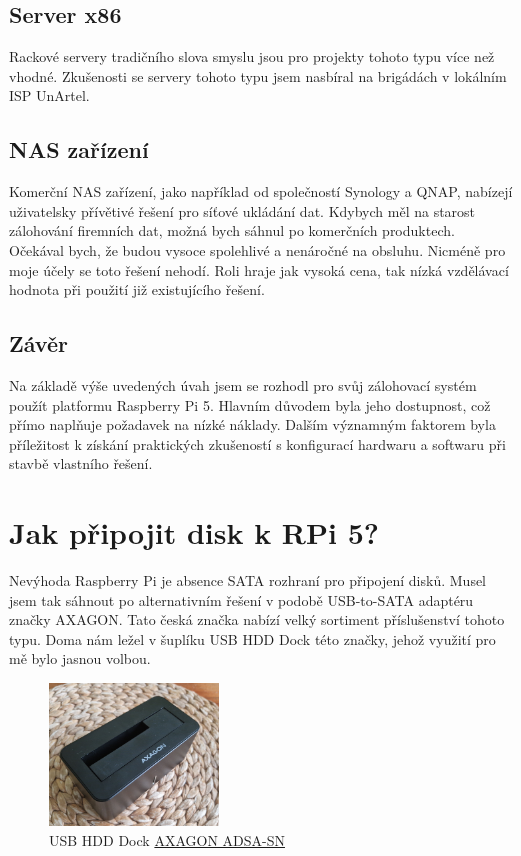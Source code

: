 \documentclass[a4paper,12pt, oneside]{book}
\begin{document}
\subsection{Server x86}

Rackové servery tradičního slova smyslu jsou pro projekty tohoto typu
více než vhodné. Zkušenosti se servery tohoto typu
jsem nasbíral na brigádách v lokálním ISP UnArtel. 

\subsection{NAS zařízení}

Komerční NAS zařízení, jako například od společností Synology a QNAP, nabízejí
uživatelsky přívětivé řešení pro síťové ukládání dat. Kdybych 
měl na starost zálohování firemních dat, možná bych sáhnul po komerčních
produktech. Očekával bych, že budou vysoce spolehlivé a nenáročné na obsluhu.
Nicméně pro moje účely se toto řešení nehodí. Roli hraje jak vysoká cena,
tak nízká vzdělávací hodnota při použití již existujícího řešení.

\subsection{Závěr}



Na základě výše uvedených úvah jsem se rozhodl pro svůj zálohovací systém použít
platformu Raspberry Pi 5. Hlavním důvodem byla jeho dostupnost, což přímo
naplňuje požadavek na nízké náklady. Dalším významným faktorem byla příležitost
k získání praktických zkušeností s konfigurací hardwaru a softwaru při stavbě
vlastního řešení.


\section{Jak připojit disk k RPi 5?}

Nevýhoda Raspberry Pi je absence SATA rozhraní pro připojení disků.
Musel jsem tak sáhnout po alternativním řešení v podobě 
USB-to-SATA adaptéru značky AXAGON. Tato česká značka nabízí 
velký sortiment příslušenství tohoto typu. Doma nám ležel v šuplíku
USB HDD Dock této značky, jehož využití pro mě 
bylo jasnou volbou.

\begin{figure}[h]
	\centering
	\includegraphics[width=0.4\textwidth]{img/axagon.jpg}
	\caption{USB HDD Dock \href{https://www.axagon.eu/produkty/adsa-sn}{AXAGON ADSA-SN}}
\end{figure}
\end{document}
